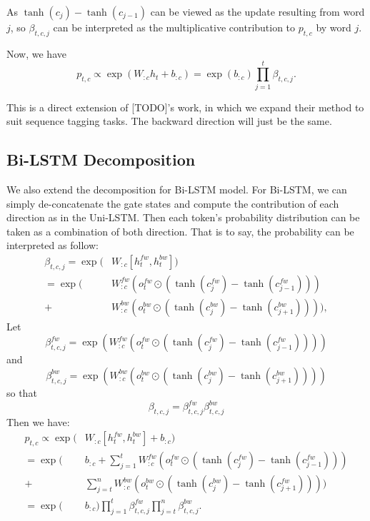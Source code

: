 \documentclass{article}
\begin{document}
As $\tanh(c_j) - \tanh(c_{j-1})$ can be viewed as the update resulting from word $j$, so $\beta_{t, c, j}$ can be interpreted as the multiplicative contribution to $p_{t, c}$ by word $j$. 

Now, we have 
\begin{equation}
p_{t, c} \propto \exp( W_{:c} h_t + b_{:c}) = \exp(b_{:c})\prod_{j=1}^t \beta_{t, c, j}.
\end{equation}

This is a direct extension of [TODO]'s work, in which we expand their method to suit sequence tagging tasks.
The backward direction will just be the same.

\subsection{Bi-LSTM Decomposition}

We also extend the decomposition for Bi-LSTM model. For Bi-LSTM, we can simply de-concatenate the gate states and compute the contribution of each direction as in the Uni-LSTM. Then each token's probability distribution can be taken as a combination of both direction. That is to say, the probability can be interpreted as follow:
\begin{align}\label{eq:bi-beta} 
\beta_{t, c, j} = \exp(&W_{:c} [h_t^{fw}, h_t^{bw}])\\
= \exp(&W_{:c}^{fw} (o_t^{fw} \odot (\tanh(c_j^{fw})- \tanh(c_{j-1}^{fw}))) \\
+ &W_{:c}^{bw} (o_t^{bw} \odot (\tanh(c_j^{bw})- \tanh(c_{j+1}^{bw})))),
\end{align}
Let
\begin{equation}
\beta_{t, c, j}^{fw} = \exp(W_{:c}^{fw} (o_t^{fw} \odot (\tanh(c_j^{fw})- \tanh(c_{j-1}^{fw}))))
\end{equation}
and
\begin{equation}
\beta_{t, c, j}^{bw} = \exp(W_{:c}^{bw} (o_t^{bw} \odot (\tanh(c_j^{bw})- \tanh(c_{j+1}^{bw}))))
\end{equation}
so that 
\begin{equation}
\beta_{t, c, j} = \beta_{t, c, j}^{fw} \beta_{t, c, j}^{bw}
\end{equation}
Then we have:
\begin{align}
p_{t, c} \propto \exp(&W_{:c} [h_t^{fw}, h_t^{bw}] + b_{:c}) \\
= \exp(&b_{:c} + \sum_{j=1}^t W_{:c}^{fw} (o_t^{fw} \odot (\tanh(c_j^{fw}) - \tanh(c_{j-1}^{fw})))\\
	+&\sum_{j=t}^n W_{:c}^{bw} (o_t^{bw} \odot (\tanh(c_j^{bw}) - \tanh(c_{j+1}^{fw}))))\\
=  \exp(&b_{:c})\prod_{j=1}^t \beta_{t, c, j}^{fw} \prod_{j=t}^n \beta_{t, c, j}^{bw}.
\end{align}
\end{document}
